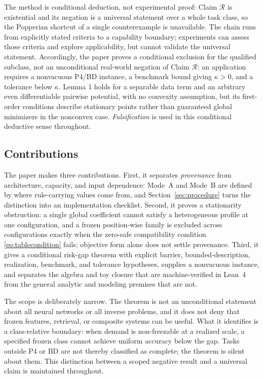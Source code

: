 \documentclass[twoside,11pt]{article}
\begin{document}
The method is conditional deduction, not experimental proof: Claim $\mathcal{R}$ is existential and its negation is a universal statement over a whole task class, so the Popperian shortcut of a single counterexample \citep{popper1959} is unavailable. The chain runs from explicitly stated criteria to a capability boundary; experiments can assess those criteria and explore applicability, but cannot validate the universal statement. Accordingly, the paper proves a conditional exclusion for the qualified subclass, not an unconditional real-world negation of Claim $\mathcal{R}$: an application requires a nonvacuous P4/BD instance, a benchmark bound giving $\kappa>0$, and a tolerance below $\kappa$. Lemma 1 holds for a separable data term and an arbitrary even differentiable pairwise potential, with no convexity assumption, but its first-order conditions describe stationary points rather than guaranteed global minimizers in the nonconvex case. \emph{Falsification} is used in this conditional deductive sense throughout. %

\subsection{Contributions}

The paper makes three contributions. First, it separates \emph{provenance} from architecture, capacity, and input dependence: Mode~A and Mode~B are defined by where rule-carrying values come from, and Section~\ref{sec:procedure} turns the distinction into an implementation checklist. Second, it proves a stationarity obstruction: a single global coefficient cannot satisfy a heterogeneous profile at one configuration, and a frozen position-wise family is excluded across configurations exactly when the zero-safe compatibility condition \eqref{eq:tablecondition} fails; objective form alone does not settle provenance. Third, it gives a conditional risk-gap theorem with explicit barrier, bounded-description, realization, benchmark, and tolerance hypotheses, supplies a nonvacuous instance, and separates the algebra and toy closure that are machine-verified in Lean~4 from the general analytic and modeling premises that are not.

The scope is deliberately narrow. The theorem is not an unconditional statement about all neural networks or all inverse problems, and it does not deny that frozen features, retrieval, or composite systems can be useful. What it identifies is a class-relative boundary: when demand is non-freezable at a realized scale, a specified frozen class cannot achieve uniform accuracy below the gap. Tasks outside P4 or BD are not thereby classified as complete; the theorem is silent about them. This distinction between a scoped negative result and a universal claim is maintained throughout.
\end{document}
